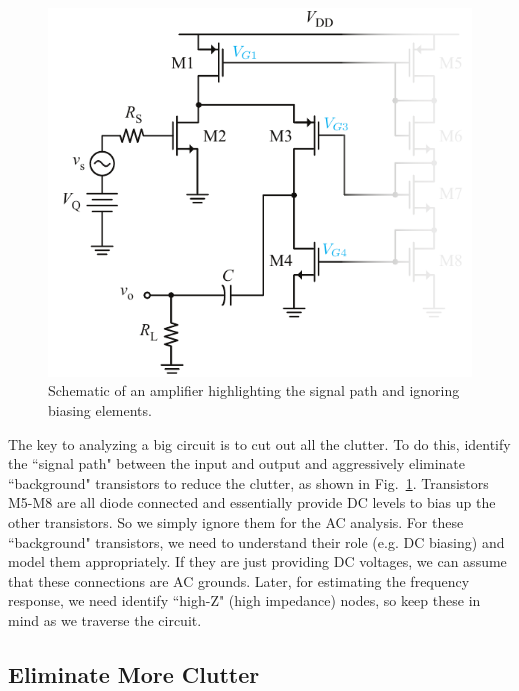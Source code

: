 \begin{figure}[tb]
\begin{center}
\includegraphics[scale=1]{17cascode_folded_declutter}
\end{center}
\caption{Schematic of an amplifier highlighting the signal path and ignoring biasing elements.} \label{fig:17cascode_folded_declutter}
\end{figure}

The key to analyzing a big circuit is to cut out all the clutter.  To do this, identify the ``signal path" between the input and output and aggressively eliminate ``background" transistors to reduce the clutter, as shown in Fig.~\ref{fig:17cascode_folded_declutter}.  Transistors M5-M8 are all diode connected and essentially provide DC levels to bias up the other transistors.  So we simply ignore them for the AC analysis.  For these ``background" transistors, we need to understand their role (e.g. DC biasing) and model them appropriately.  If they are just providing DC voltages, we can assume that these connections are AC grounds.  Later, for estimating the frequency response, we need identify ``high-Z" (high impedance) nodes, so keep these in mind as we traverse the circuit.


 

\subsection{Eliminate More Clutter}


